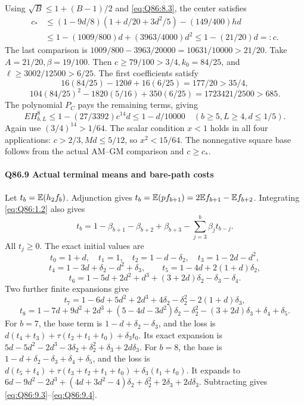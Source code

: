 Using \(\sqrt B\le\allowbreak 1+(B-1)/2\) and \eqref{eq:Q86:8.3}, the center satisfies
\[
\begin{split}
c_*&\le(1-9d/8)(1+d/20+3d^2/5)-(149/400)hd\\
&\le1-(1009/800)d+(3963/4000)d^2
\le1-(21/20)d=:c.
\end{split}
\tag{Q86.8.4}\label{eq:Q86:8.4}
\]
The last comparison is
\(1009/800-3963/20000=\allowbreak 10631/10000>\allowbreak 21/20\).
Take \(A=\allowbreak 21/20,\allowbreak \beta=\allowbreak 19/100\).
Then \(c\ge\allowbreak 79/100>\allowbreak 3/4,\allowbreak k_0=\allowbreak 84/25\), and
\(\ell\ge\allowbreak 3002/12500>\allowbreak 6/25\).
The first coefficients satisfy
\[
16(84/25)-120\theta+16(6/25)=177/20>35/4,
\]
\[
104(84/25)^2-1820(5/16)+350(6/25)
=1723421/2500>685.
\]
The polynomial \(P_C\) pays the remaining terms, giving
\[
E H_{b,L}^8\le1-(27/3392)c^{14}d\le1-d/10000
\quad(b\ge5,L\ge4,d\le1/5).
\tag{Q86.8.5}\label{eq:Q86:8.5}
\]
Again use \((3/4)^{14}>\allowbreak 1/64\).
The scalar condition \(x<\allowbreak 1\) holds in all four applications:
\(c>\allowbreak 2/3,\allowbreak Md\le\allowbreak 5/12\), so \(x^2<\allowbreak 15/64\).
The nonnegative square base follows from the actual AM--GM comparison and \(c\ge\allowbreak  c_*\).

\paragraph{Q86.9 Actual terminal means and bare-path costs}
Let \(t_b=\allowbreak \mathbb E(h_2f_b)\).
Adjunction gives
\(t_b=\allowbreak \mathbb E(pf_{b+1})=\allowbreak 2\mathbb E f_{b+1}-\mathbb E f_{b+2}\).
Integrating \eqref{eq:Q86:1.2} also gives
\[
t_b=1-\beta_{b+1}-\beta_{b+2}+\beta_{b+3}
-\sum_{j=3}^b\beta_jt_{b-j}.
\tag{Q86.9.1}\label{eq:Q86:9.1}
\]
All \(t_j\ge\allowbreak 0\). The exact initial values are
\[
t_0=1+d,\quad t_1=1,\quad t_2=1-d-\delta_2,\quad t_3=1-2d-d^2,
\]
\[
t_4=1-3d+\delta_2-d^2+\delta_3,\qquad t_5=1-4d+2(1+d)\delta_2,
\]
\[
t_6=1-5d+2d^2+d^3+(3+2d)\delta_2-\delta_3-\delta_4.
\tag{Q86.9.2}\label{eq:Q86:9.2}
\]
Two further finite expansions give
\[
t_7=1-6d+5d^2+2d^3+4\delta_2-\delta_2^2-2(1+d)\delta_3,
\tag{Q86.9.3}\label{eq:Q86:9.3}
\]
\[
t_8=1-7d+9d^2+2d^3+(5-4d-3d^2)\delta_2-\delta_2^2
 -(3+2d)\delta_3+\delta_4+\delta_5.
\tag{Q86.9.4}\label{eq:Q86:9.4}
\]
For \(b=\allowbreak 7\), the base term is
\(1-d+\delta_2-\delta_3\), and the loss is
\(d(t_4+t_3)+\tau(t_2+t_1+t_0)+\delta_3t_0\).
Its exact expansion is
\(5d-5d^2-2d^3-3\delta_2+\delta_2^2+\delta_3+2d\delta_3\).
For \(b=\allowbreak 8\), the base is
\(1-d+\delta_2-\delta_3+\delta_4+\delta_5\), and the loss is
\(d(t_5+t_4)+\tau(t_3+t_2+t_1+t_0)+\delta_3(t_1+t_0)\).
It expands to
\(6d-9d^2-2d^3+(4d+3d^2-4)\delta_2+\delta_2^2+2\delta_3+2d\delta_3\).
Subtracting gives \eqref{eq:Q86:9.3}--\eqref{eq:Q86:9.4}.

